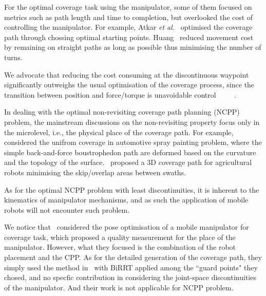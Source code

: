 \documentclass[conference]{IEEEtran}
\begin{document}


For the optimal coverage task using the manipulator, some of them focused on metrics such as path length and time to completion, but overlooked the cost of controlling the manipulator. For example, 
Atkar \textit{et al.}~\cite{Atkar2003Towards} optimised the coverage path through chossing optimal starting points. 
Huang~\cite{huang2001optimal} reduced movement cost by remaining on straight paths as long as possible thus minimising the number of turns. 

We advocate that reducing the cost consuming at the discontinuous waypoint significantly outweighs the usual optimisation of the coverage process, since the transition between position and force/torque is unavoidable
control~\cite{cheah2003brief}~\cite{heck2015switched}~\cite{mirrazavi2018a}~\cite{solanes2018adaptive}~\cite{solanes2019robust}. 



In dealing with the optimal non-revisiting coverage path planning (NCPP) problem, the mainstream discussions on the non-revisiting 
property focus only in the microlevel, i.e., the physical place of the coverage path. For example,~\cite{Atkar2009Hierarchical} considered 
the unifrom coverage in automotive spray painting problem, where the simple back-and-force boustrophedon path are deformed based on 
the curvature and the topology of the surface.~\cite{hameed2016side-to-side} proposed a 3D coverage path for agricultural robots 
minimising the skip/overlap areas between swaths. 



As for the optimal NCPP problem with least discontinuities, it is inherent to the kinematics of manipulator mechanisms, and as such 
the application of mobile robots will not encounter such problem. 


We notice that~\cite{paus2017a} considered the pose optimisation of a mobile manipulator for coverage task, which proposed a 
quality measurement for the place of the manipulator. However, what they focused is the combination of the robot placement and the CPP. 
As for the detailed generation of the coverage path, they simply used the method in~\cite{Danner2000Randomized} with BiRRT applied 
among the ``guard points" they chosed, and no specfic contribution in considering the joint-space discontinuities of the manipulator. And their work is not applicable for NCPP problem. 
\end{document}
